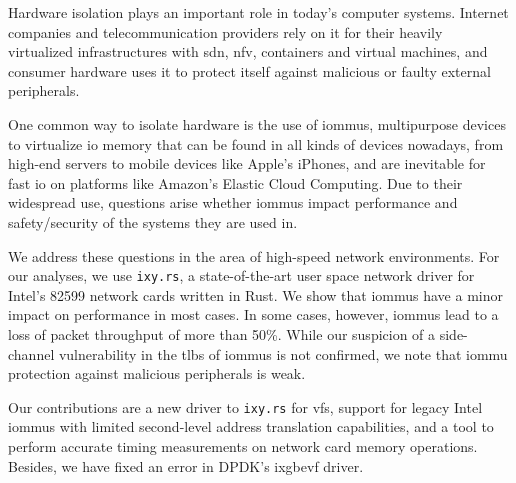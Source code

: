 \small

Hardware isolation plays an important role in today's computer systems.
Internet companies and telecommunication providers rely on it for their heavily
virtualized infrastructures with \acl{sdn}, \acl{nfv}, containers and virtual
machines, and consumer hardware uses it to protect itself against malicious or
faulty external peripherals.

One common way to isolate hardware is the use of \acp{iommu}, multipurpose
devices to virtualize \acs{io} memory that can be found in all kinds of devices
nowadays, from high-end servers to mobile devices like Apple's iPhones, and are
inevitable for fast \ac{io} on platforms like Amazon's Elastic Cloud Computing.
Due to their widespread use, questions arise whether \acp{iommu} impact
performance and safety/security of the systems they are used in.

We address these questions in the area of high-speed network environments. For
our analyses, we use \texttt{ixy.rs}, a state-of-the-art user space network
driver for Intel's 82599 network cards written in Rust. We show that \acp{iommu}
have a minor impact on performance in most cases. In some cases, however,
\acp{iommu} lead to a loss of packet throughput of more than 50\%. While our
suspicion of a side-channel vulnerability in the \aclp{tlb} of \acp{iommu} is
not confirmed, we note that \ac{iommu} protection against malicious peripherals
is weak.

Our contributions are a new driver to \texttt{ixy.rs} for \aclp{vf}, support for
legacy Intel \acp{iommu} with limited second-level address translation
capabilities, and a tool to perform accurate timing measurements on network card
memory operations. Besides, we have fixed an error in DPDK's ixgbevf driver.

